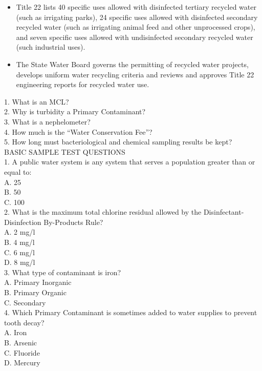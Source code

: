\begin{itemize}
\item Title 22 lists 40 specific uses allowed with disinfected tertiary recycled water (such as irrigating parks), 24 specific uses allowed with disinfected secondary recycled water (such as irrigating animal feed and other unprocessed crops), and seven specific uses allowed with undisinfected secondary recycled water (such industrial uses).\\

\item The State Water Board governs the permitting of recycled water projects, develops uniform water recycling criteria and reviews and approves Title 22 engineering reports for recycled water use.\\
\end{itemize}

1.	What is an MCL?\\
2.	Why is turbidity a Primary Contaminant?\\
3.	What is a nephelometer?\\
4.	How much is the “Water Conservation Fee”?\\
5.	How long must bacteriological and chemical sampling results be kept?\\

BASIC SAMPLE TEST QUESTIONS\\
1.	A public water system is any system that serves a population greater than or equal to:\\
A.	25\\
B.	50\\
C.	100\\

2.	What is the maximum total chlorine residual allowed by the Disinfectant-Disinfection By-Products Rule?\\
A.	2 mg/l\\
B.	4 mg/l\\
C.	6 mg/l\\
D.	8 mg/l\\

3.	What type of contaminant is iron?\\
A.	Primary Inorganic\\
B.	Primary Organic\\
C.	Secondary\\

4.	Which Primary Contaminant is sometimes added to water supplies to prevent tooth decay?\\
A.	Iron\\
B.	Arsenic\\
C.	Fluoride\\
D.	Mercury\\

